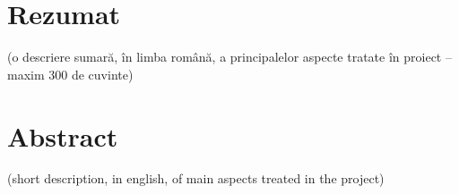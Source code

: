 \documentclass[a4paper,12pt]{report}
\begin{document}
\clearpage
        
\printbibliography
{}
\clearpage


\section*{Rezumat}

(o descriere sumară, în limba română, a principalelor aspecte tratate în proiect – maxim 300 de cuvinte)

\clearpage


\section*{Abstract}

(short description, in english, of main aspects treated in the project)

\clearpage
\end{document}
